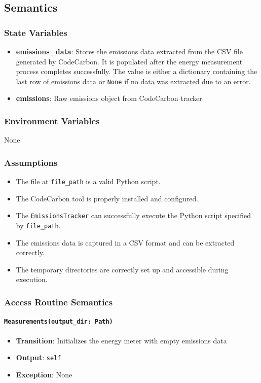 \documentclass[12pt, titlepage]{article}
\begin{document}
\subsection{Semantics}

\subsubsection{State Variables}

\begin{itemize}
\item \textbf{emissions\_data}: Stores the emissions data extracted from the CSV file generated by CodeCarbon. It is populated after the energy measurement process completes successfully. The value is either a dictionary containing the last row of emissions data or \texttt{None} if no data was extracted due to an error.
\item \textbf{emissions}: Raw emissions object from CodeCarbon tracker
\end{itemize}

\subsubsection{Environment Variables}
None

\subsubsection{Assumptions}

\begin{itemize}
\item The file at \texttt{file\_path} is a valid Python script.
\item The CodeCarbon tool is properly installed and configured.
\item The \texttt{EmissionsTracker} can successfully execute the Python script specified by \texttt{file\_path}.
\item The emissions data is captured in a CSV format and can be extracted correctly.
\item The temporary directories are correctly set up and accessible during execution.
\end{itemize}

\subsubsection{Access Routine Semantics}

\paragraph{\texttt{Measurements(output\_dir: Path)}}
\begin{itemize}
\item \textbf{Transition}: Initializes the energy meter with empty emissions data
\item \textbf{Output}: \texttt{self}
\item \textbf{Exception}: None
\end{itemize}
\end{document}
